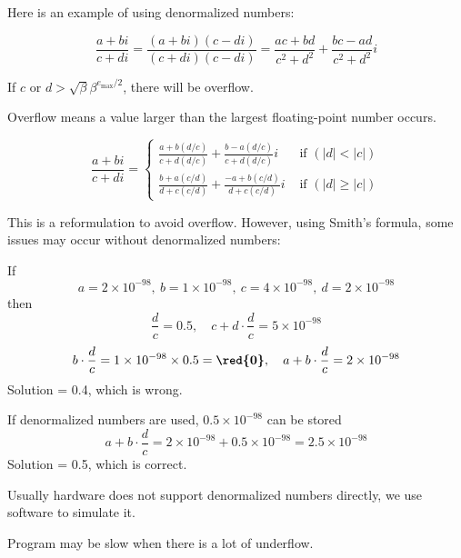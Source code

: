 Here is an example of using denormalized numbers:
\begin{eg}
    \[
        \frac{a+bi}{c+di} = \frac{(a+bi)(c-di)}{(c+di)(c-di)} = \frac{ac+bd}{c^2 + d^2} + \frac{bc - ad}{c^2 + d^2}i
    \]
\end{eg}
\vspace{0.5em}

If $c$ or $d > \sqrt{\beta} \beta^{e_{\max}/2}$, there will be overflow.

\begin{definition}[Overflow]
    Overflow means a value larger than the largest floating-point number occurs.
\end{definition}

\begin{lemma}
    \[
        \frac{a + bi}{c+di} = \begin{cases}
            \frac{a + b(d/c)}{c + d(d/c)} + \frac{b - a(d/c)}{c + d(d/c)}i & \mbox{ if } (|d| < |c|) \\
            \frac{b + a(c/d)}{d + c(c/d)} + \frac{-a + b(c/d)}{d + c(c/d)}i & \mbox{ if } (|d| \geq |c|)
        \end{cases}
    \]
\end{lemma}

\newpage

This is a reformulation to avoid overflow. However, using Smith's formula, some issues may occur without denormalized numbers: 

If \[
    a = 2 \times 10^{-98},\ b = 1 \times 10^{-98},\ c = 4 \times 10^{-98},\ d = 2 \times 10^{-98}
\]
then
\[
    \frac{d}{c} = 0.5,\quad c + d\cdot\frac{d}{c} = 5 \times 10^{-98}
\]
\[
    b \cdot \frac{d}{c} = 1 \times 10^{-98} \times 0.5 = \textbf{\red{0}}, \quad a + b \cdot \frac{d}{c} = 2 \times 10^{-98}
\]
Solution = 0.4, which is wrong.
\vspace{0.5em}

If denormalized numbers are used, $0.5 \times 10^{-98}$ can be stored \[
    a + b \cdot \frac{d}{c} = 2 \times 10^{-98} + 0.5 \times 10^{-98} = 2.5 \times 10^{-98}
\]
Solution = 0.5, which is correct.

\begin{note}
    Usually hardware does not support denormalized numbers directly, we use software to simulate it.
\end{note}

\begin{note}
    Program may be slow when there is a lot of underflow.
\end{note}

